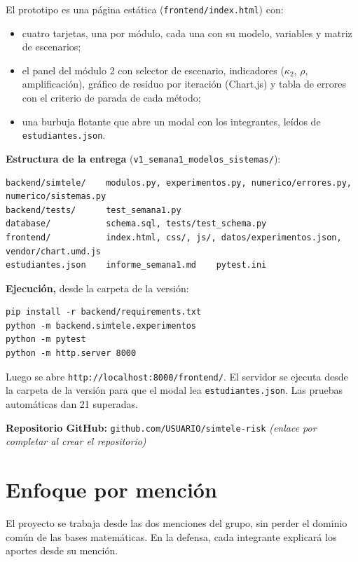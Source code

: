 \documentclass[
  11pt,
  letterpaper,
]{article}
\providecommand{\tightlist}{%
  \setlength{\itemsep}{0pt}\setlength{\parskip}{0pt}}
\begin{document}
El prototipo es una página estática (\texttt{frontend/index.html}) con:

\begin{itemize}
\tightlist
\item
  cuatro tarjetas, una por módulo, cada una con su modelo, variables y
  matriz de escenarios;
\item
  el panel del módulo 2 con selector de escenario, indicadores
  (\(\kappa_2\), \(\rho\), amplificación), gráfico de residuo por
  iteración (Chart.js) y tabla de errores con el criterio de parada de
  cada método;
\item
  una burbuja flotante que abre un modal con los integrantes, leídos de
  \texttt{estudiantes.json}.
\end{itemize}

\textbf{Estructura de la entrega}
(\texttt{v1\_semana1\_modelos\_sistemas/}):

\begin{verbatim}
backend/simtele/    modulos.py, experimentos.py, numerico/errores.py, numerico/sistemas.py
backend/tests/      test_semana1.py
database/           schema.sql, tests/test_schema.py
frontend/           index.html, css/, js/, datos/experimentos.json, vendor/chart.umd.js
estudiantes.json    informe_semana1.md    pytest.ini
\end{verbatim}

\textbf{Ejecución,} desde la carpeta de la versión:

\begin{verbatim}
pip install -r backend/requirements.txt
python -m backend.simtele.experimentos
python -m pytest
python -m http.server 8000
\end{verbatim}

Luego se abre \texttt{http://localhost:8000/frontend/}. El servidor se
ejecuta desde la carpeta de la versión para que el modal lea
\texttt{estudiantes.json}. Las pruebas automáticas dan 21 superadas.

\textbf{Repositorio GitHub:} \texttt{github.com/USUARIO/simtele-risk}
\emph{(enlace por completar al crear el repositorio)}

\hypertarget{menciones}{%
\section{Enfoque por mención}\label{menciones}}

El proyecto se trabaja desde las dos menciones del grupo, sin perder el
dominio común de las bases matemáticas. En la defensa, cada integrante
explicará los aportes desde su mención.
\end{document}

